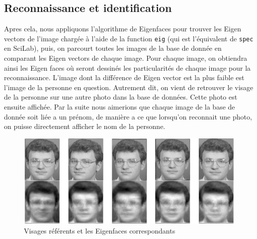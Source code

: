 \documentclass[12pt,a4paper]{article}
\begin{document}
\subsection{Reconnaissance et identification}
Apres cela, nous appliquons l’algorithme de Eigenfaces pour trouver les Eigen vectors de l’image chargée à l'aide de la function \texttt{eig} (qui est l'équivalent de \texttt{spec} en SciLab), puis, on parcourt toutes les images de la base de donnée en comparant les Eigen vectors de chaque image. Pour chaque image, on obtiendra ainsi les Eigen faces où seront dessinés les particularités de chaque image pour la reconnaissance. L’image dont la différence de Eigen vector est la plus faible est l’image de la personne en question. Autrement dit, on vient de retrouver le visage de la personne sur une autre photo dans la base de données. Cette photo est ensuite affichée. Par la suite nous aimerions que chaque image de la base de donnée soit liée a un prénom, de manière a ce que lorsqu’on reconnait une photo, on puisse directement afficher le nom de la personne.

\begin{figure}[H]
\centering
\includegraphics[scale=0.3]{img/eigenfaces.png}
\caption{Visages référents et les Eigenfaces correspondants}
\end{figure}
\end{document}
